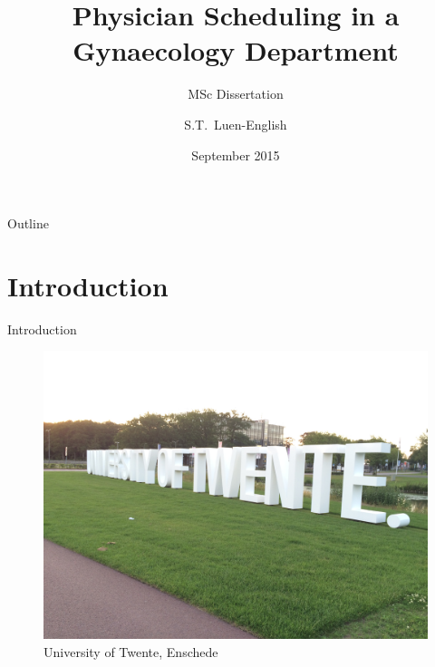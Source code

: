 \documentclass{beamer}
\title[Physician Scheduling]{Physician Scheduling in a Gynaecology Department}
\subtitle{MSc Dissertation}
\author{S.T.~Luen-English}
\institute[Cardiff University]
{
  Department of Mathematics\\
  Cardiff University}
\date{September 2015}
\begin{document}
\begin{frame}
  \titlepage
\end{frame}

\begin{frame}{Outline}
\setcounter{tocdepth}{1}
  \tableofcontents
\end{frame}

\section{Introduction}

\begin{frame}{Introduction}
    \begin{figure}
        \centering
        \includegraphics[width=0.6\linewidth]{img/utwente}
        \caption{University of Twente, Enschede}
    \end{figure}
\end{frame}
\end{document}
